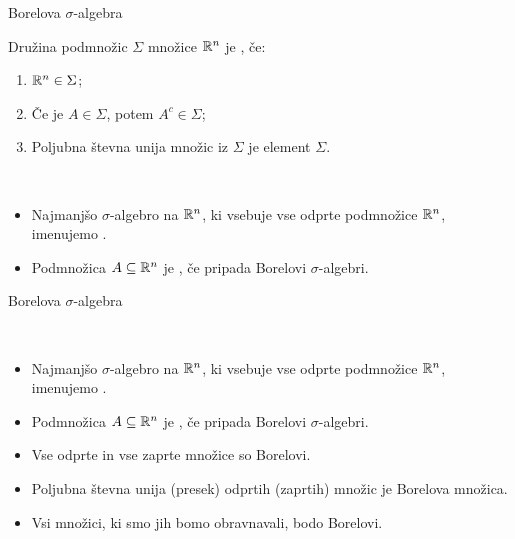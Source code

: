 \documentclass[10pt]{beamer}
\begin{document}
\begin{frame}{Borelova \(\sigma\)-algebra}
    \begin{definicija} 
        Družina podmnožic \(\Sigma\) množice \(\mathbb{R}^n\) je , če:
        \begin{enumerate}
            \item \(\mathbb{R}^n \in \Sigma\);
            \item Če je \(A \in \Sigma\), potem \(A^c \in \Sigma\);
            \item Poljubna števna unija množic iz \(\Sigma\) je element \(\Sigma\).
        \end{enumerate} 
    \end{definicija}

    \pause

    \begin{definicija} \ 
        \begin{itemize}
            \item Najmanjšo \(\sigma\)-algebro na \(\mathbb{R}^n\), ki vsebuje vse odprte podmnožice \(\mathbb{R}^n\), imenujemo .
            \item Podmnožica \(A \subseteq \mathbb{R}^n\) je \df{Borelova}, če pripada Borelovi \(\sigma\)-algebri.
        \end{itemize}
    \end{definicija}
\end{frame}

\begin{frame}{Borelova \(\sigma\)-algebra}
    \begin{definicija} \ 
        \begin{itemize}
            \item Najmanjšo \(\sigma\)-algebro na \(\mathbb{R}^n\), ki vsebuje vse odprte podmnožice \(\mathbb{R}^n\), imenujemo .
            \item Podmnožica \(A \subseteq \mathbb{R}^n\) je , če pripada Borelovi \(\sigma\)-algebri.
        \end{itemize}
    \end{definicija}

    \begin{opomba}
        \begin{itemize}
            \item Vse odprte in vse zaprte množice so Borelovi.
            \item Poljubna števna unija (presek) odprtih (zaprtih) množic je Borelova množica. 
            \item Vsi množici, ki smo jih bomo obravnavali, bodo Borelovi.
        \end{itemize}
    \end{opomba}
\end{frame}
\end{document}
